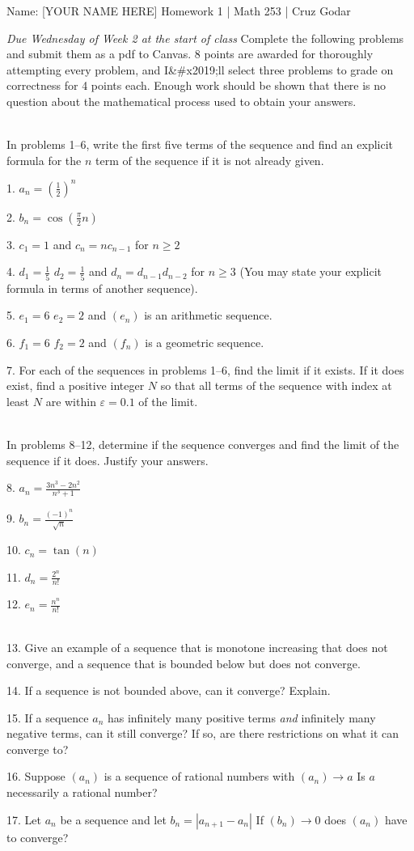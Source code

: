 \documentclass{article}
\begin{document}
\Large Name: [YOUR NAME HERE] \hfill Homework 1 | Math 253 | Cruz Godar \vspace{4pt} \normalsize

\textit{Due Wednesday of Week 2 at the start of class}
Complete the following problems and submit them as a pdf to Canvas. 8 points are awarded for thoroughly attempting every problem, and I&#x2019;ll select three problems to grade on correctness for 4 points each. Enough work should be shown that there is no question about the mathematical process used to obtain your answers.

~\\
In problems 1--6, write the first five terms of the sequence and find an explicit formula for the $n$ term of the sequence if it is not already given.

1. $\displaystyle a_n = \left( \frac{1}{2} \right)^n$

2. $\displaystyle b_n = \cos\left( \frac{\pi}{2} n \right)$

3. $\displaystyle c_1 = 1$ and $\displaystyle c_n = nc_{n - 1}$ for $n \geq 2$

4. $\displaystyle d_1 = \frac{1}{5}$ $\displaystyle d_2 = \frac{1}{5}$ and $d_n = d_{n - 1}d_{n - 2}$ for $n \geq 3$ (You may state your explicit formula in terms of another sequence).

5. $e_1 = 6$ $e_2 = 2$ and $(e_n)$ is an arithmetic sequence.

6. $f_1 = 6$ $f_2 = 2$ and $(f_n)$ is a geometric sequence.

7. For each of the sequences in problems 1--6, find the limit if it exists. If it does exist, find a positive integer $N$ so that all terms of the sequence with index at least $N$ are within $\varepsilon = 0.1$ of the limit.

~\\
In problems 8--12, determine if the sequence converges and find the limit of the sequence if it does. Justify your answers.

8. $\displaystyle a_n = \frac{3n^3 - 2n^2}{n^3 + 1}$

9. $\displaystyle b_n = \frac{(-1)^n}{\sqrt{n}}$

10. $\displaystyle c_n = \tan(n)$

11. $\displaystyle d_n = \frac{2^n}{n!}$

12. $\displaystyle e_n = \frac{n^n}{n!}$

~\\

13. Give an example of a sequence that is monotone increasing that does not converge, and a sequence that is bounded below but does not converge.

14. If a sequence is not bounded above, can it converge? Explain.

15. If a sequence $a_n$ has infinitely many positive terms \textit{and} infinitely many negative terms, can it still converge? If so, are there restrictions on what it can converge to?

16. Suppose $(a_n)$ is a sequence of rational numbers with $(a_n) \to a$ Is $a$ necessarily a rational number?

17. Let $a_n$ be a sequence and let $b_n = \left| a_{n + 1} - a_n \right|$ If $(b_n) \to 0$ does $(a_n)$ have to converge?
\end{document}
